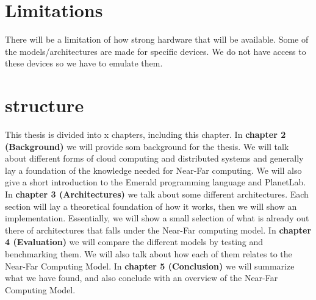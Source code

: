 \section{Limitations}
There will be a limitation of how strong hardware that will be available. Some of the models/architectures are made for specific devices. We do not have access to these devices so we have to emulate them.


\section{structure}
This thesis is divided into x chapters, including this chapter. 
In \textbf{chapter 2 (Background)} we will provide som background for the thesis. We will talk about different forms of cloud computing and distributed systems and generally lay a foundation of the knowledge needed for Near-Far computing. We will also give a short introduction to the Emerald programming language and PlanetLab.
In \textbf{chapter 3 (Architectures)} we talk about some different architectures. Each section will lay a theoretical foundation of how it works, then we will show an implementation. Essentially, we will show a small selection of what is already out there of architectures that falls under the Near-Far computing model.
In \textbf{chapter 4 (Evaluation)} we will compare the different models by testing and benchmarking them. We will also talk about how each of them relates to the Near-Far Computing Model.
In \textbf{chapter 5 (Conclusion)} we will summarize what we have found, and also conclude with an overview of the Near-Far Computing Model.

